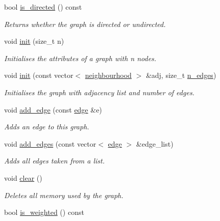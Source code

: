 \begin{DoxyCompactItemize}
bool \hyperlink{classlgraph_1_1utils_1_1udgraph_aa6fc318096cc4b577374f002b07ab49b}{is\-\_\-directed} () const 
\begin{DoxyCompactList}\small\item\em Returns whether the graph is directed or undirected. \end{DoxyCompactList}\item 
void \hyperlink{classlgraph_1_1utils_1_1uxgraph_ab1e7ab39be6e8ca6149eef47dd51b155}{init} (size\-\_\-t n)
\begin{DoxyCompactList}\small\item\em Initialises the attributes of a graph with {\itshape n} nodes. \end{DoxyCompactList}\item 
void \hyperlink{classlgraph_1_1utils_1_1uxgraph_ac93cb68bbc1d9c30cb33114cb449bb0a}{init} (const vector$<$ \hyperlink{namespacelgraph_1_1utils_a0f2ef47028a466d26841709e705390ac}{neighbourhood} $>$ \&adj, size\-\_\-t \hyperlink{classlgraph_1_1utils_1_1xxgraph_af3f7c3835406c2cbf70479ae1c0253c9}{n\-\_\-edges})
\begin{DoxyCompactList}\small\item\em Initialises the graph with adjacency list and number of edges. \end{DoxyCompactList}\item 
void \hyperlink{classlgraph_1_1utils_1_1uxgraph_a46e24b0e3208accb9e726db2877320e1}{add\-\_\-edge} (const \hyperlink{namespacelgraph_1_1utils_a6510284ce1b1ae5dc97ce5d2de426e10}{edge} \&e)
\begin{DoxyCompactList}\small\item\em Adds an edge to this graph. \end{DoxyCompactList}\item 
void \hyperlink{classlgraph_1_1utils_1_1uxgraph_af6f7c0a2dc67706a07bd58f06b3dcf9f}{add\-\_\-edges} (const vector$<$ \hyperlink{namespacelgraph_1_1utils_a6510284ce1b1ae5dc97ce5d2de426e10}{edge} $>$ \&edge\-\_\-list)
\begin{DoxyCompactList}\small\item\em Adds all edges taken from a list. \end{DoxyCompactList}\item 
void \hyperlink{classlgraph_1_1utils_1_1uxgraph_ae76c83683dc7527fe5394d67437a7107}{clear} ()
\begin{DoxyCompactList}\small\item\em Deletes all memory used by the graph. \end{DoxyCompactList}\item 
\hypertarget{classlgraph_1_1utils_1_1uxgraph_ae1c3f40bb80ab20c2de96735ccde7b3f}{bool \hyperlink{classlgraph_1_1utils_1_1uxgraph_ae1c3f40bb80ab20c2de96735ccde7b3f}{is\-\_\-weighted} () const }\label{classlgraph_1_1utils_1_1uxgraph_ae1c3f40bb80ab20c2de96735ccde7b3f}


\end{DoxyCompactItemize}
